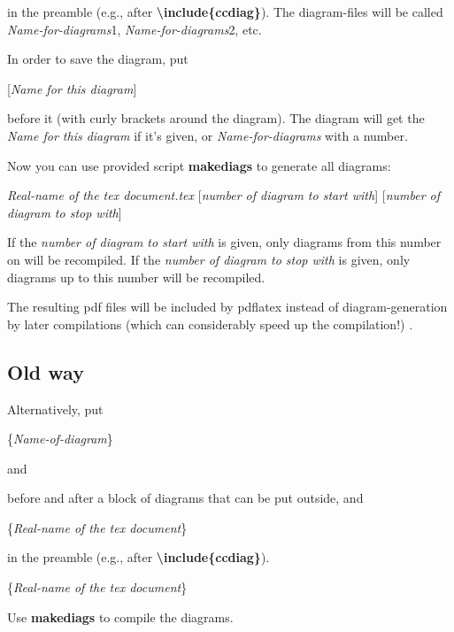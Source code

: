 \documentclass[a4paper]{article}
\newcommand{\myind}{\hspace{10pt}}
\begin{document}
in the preamble (e.g., after {\bf \textbackslash include\{ccdiag\}}).
The diagram-files will be called {\it Name-for-diagrams}1, {\it Name-for-diagrams}2, etc.

In order to save the diagram, put

\myind{\bf \textbackslash diagsav}[{\it Name for this diagram}] 

before it (with curly brackets around the diagram). The diagram will get the {\it Name for this diagram}
if it's given, or {\it Name-for-diagrams} with a number.

Now you can use provided script {\bf makediags} to generate all diagrams:

\myind{\bf makediags} {\it Real-name of the tex document.tex} [{\it number of diagram to start with}] [{\it number of diagram to stop with}]

If the {\it number of diagram to start with} is given, only diagrams from this number on will be recompiled.
If the {\it number of diagram to stop with} is given, only diagrams up to this number will be recompiled.

The resulting pdf files will be included by pdflatex 
instead of diagram-generation by later compilations (which can considerably speed up the compilation!) .

\subsection{Old way}

Alternatively, put 

\myind{\bf \textbackslash beginpgfgraphicnamed}\{{\it Name-of-diagram}\}

and

\myind{\bf \textbackslash endpgfgraphicnamed}

before and after a block of diagrams that can be put outside, and 

\myind{\bf \textbackslash pgfrealjobname}\{{\it Real-name of the tex document}\}

in the preamble (e.g., after {\bf \textbackslash include\{ccdiag\}}).


\myind{\bf \textbackslash pgfrealjobname}\{{\it Real-name of the tex document}\}

Use {\bf makediags} to compile the diagrams.
\end{document}
